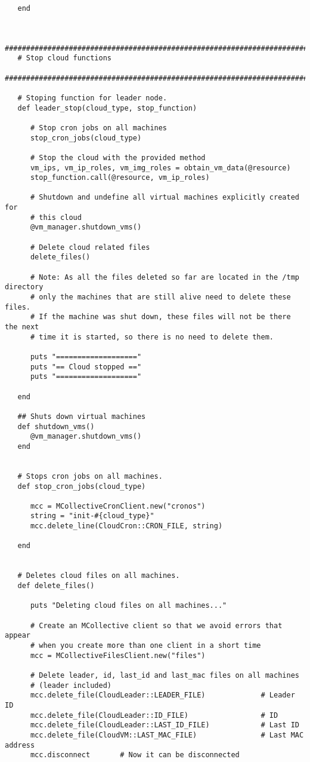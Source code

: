 \begin{lstlisting}
   end


   #############################################################################
   # Stop cloud functions
   #############################################################################

   # Stoping function for leader node.
   def leader_stop(cloud_type, stop_function)

      # Stop cron jobs on all machines
      stop_cron_jobs(cloud_type)
      
      # Stop the cloud with the provided method
      vm_ips, vm_ip_roles, vm_img_roles = obtain_vm_data(@resource)
      stop_function.call(@resource, vm_ip_roles)
      
      # Shutdown and undefine all virtual machines explicitly created for
      # this cloud
      @vm_manager.shutdown_vms()
      
      # Delete cloud related files
      delete_files()
      
      # Note: As all the files deleted so far are located in the /tmp directory
      # only the machines that are still alive need to delete these files.
      # If the machine was shut down, these files will not be there the next
      # time it is started, so there is no need to delete them.
      
      puts "==================="
      puts "== Cloud stopped =="
      puts "==================="

   end

   ## Shuts down virtual machines
   def shutdown_vms()
      @vm_manager.shutdown_vms()
   end


   # Stops cron jobs on all machines.
   def stop_cron_jobs(cloud_type)

      mcc = MCollectiveCronClient.new("cronos")
      string = "init-#{cloud_type}"
      mcc.delete_line(CloudCron::CRON_FILE, string)

   end


   # Deletes cloud files on all machines.
   def delete_files()

      puts "Deleting cloud files on all machines..."
      
      # Create an MCollective client so that we avoid errors that appear
      # when you create more than one client in a short time
      mcc = MCollectiveFilesClient.new("files")
      
      # Delete leader, id, last_id and last_mac files on all machines
      # (leader included)
      mcc.delete_file(CloudLeader::LEADER_FILE)             # Leader ID
      mcc.delete_file(CloudLeader::ID_FILE)                 # ID
      mcc.delete_file(CloudLeader::LAST_ID_FILE)            # Last ID
      mcc.delete_file(CloudVM::LAST_MAC_FILE)               # Last MAC address
      mcc.disconnect       # Now it can be disconnected
      

\end{lstlisting}
